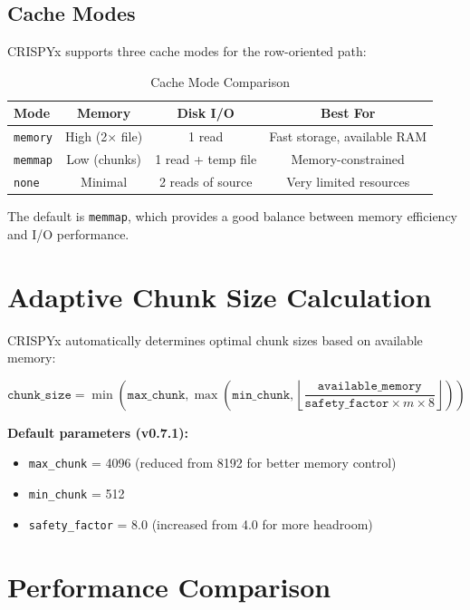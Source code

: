 \documentclass{article}
\begin{document}
\subsection{Cache Modes}

CRISPYx supports three cache modes for the row-oriented path:

\begin{table}[h]
\centering
\caption{Cache Mode Comparison}
\begin{tabular}{lccc}
\toprule
\textbf{Mode} & \textbf{Memory} & \textbf{Disk I/O} & \textbf{Best For} \\
\midrule
\texttt{memory} & High (2× file) & 1 read & Fast storage, available RAM \\
\texttt{memmap} & Low (chunks) & 1 read + temp file & Memory-constrained \\
\texttt{none} & Minimal & 2 reads of source & Very limited resources \\
\bottomrule
\end{tabular}
\end{table}

The default is \texttt{memmap}, which provides a good balance between memory efficiency 
and I/O performance.

\section{Adaptive Chunk Size Calculation}

CRISPYx automatically determines optimal chunk sizes based on available memory:

\begin{equation}
\texttt{chunk\_size} = \min\left( 
    \texttt{max\_chunk}, 
    \max\left(
        \texttt{min\_chunk},
        \left\lfloor \frac{\texttt{available\_memory}}{\texttt{safety\_factor} \times m \times 8} \right\rfloor
    \right)
\right)
\end{equation}

\textbf{Default parameters (v0.7.1):}
\begin{itemize}
    \item \texttt{max\_chunk} = 4096 (reduced from 8192 for better memory control)
    \item \texttt{min\_chunk} = 512
    \item \texttt{safety\_factor} = 8.0 (increased from 4.0 for more headroom)
\end{itemize}

\section{Performance Comparison}
\end{document}
